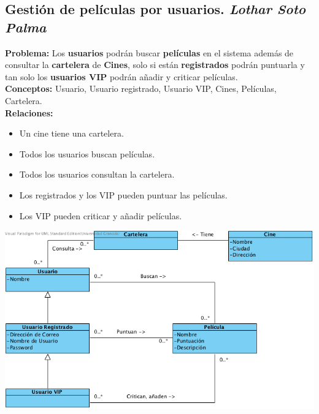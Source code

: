 \documentclass{article}
\begin{document}
	\subsection*{Gestión de películas por usuarios. \textit{Lothar Soto Palma}}
	\textbf{Problema:} Los \textbf{usuarios} podrán buscar \textbf{películas} en el sistema además de consultar la \textbf{cartelera} de \textbf{Cines}, solo si están \textbf{registrados} podrán puntuarla y tan solo los \textbf{usuarios VIP} podrán añadir y criticar películas.\\
	\textbf{Conceptos:} Usuario, Usuario registrado, Usuario VIP, Cines, Películas, Cartelera.\\
\textbf{	Relaciones:}
		\begin{itemize}
			\item Un cine tiene una cartelera.
			\item Todos los usuarios buscan películas.
			\item Todos los usuarios consultan la cartelera.
			\item Los registrados y los VIP pueden puntuar las películas.
			\item Los VIP pueden criticar y añadir películas.		
		\end{itemize}
			\includegraphics[width=1\linewidth]{./C-PeliculasUsuarios}
	
\end{document}
